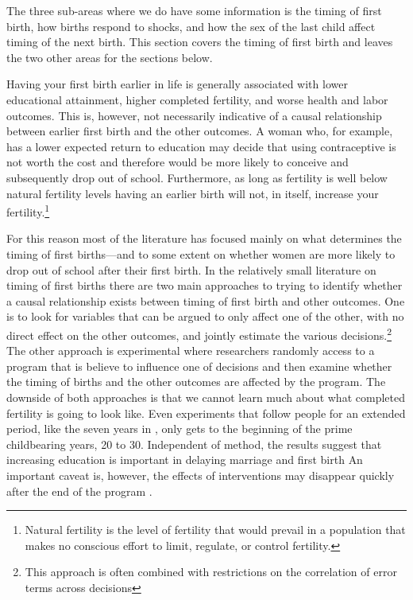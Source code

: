 \documentclass[]{article}
\begin{document}
The three sub-areas where we do have some information is the timing of first birth, how births respond to shocks, and how the sex of the last child affect timing of the next birth. This section covers the timing of first birth and leaves the two other areas for the sections below.

Having your first birth earlier in life is generally associated with lower educational attainment, higher completed fertility, and worse health and labor outcomes. This is, however, not necessarily indicative of a causal relationship between earlier first birth and the other outcomes. A woman who, for example, has a lower expected return to education may decide that using contraceptive is not worth the cost and therefore would be more likely to conceive and subsequently drop out of school. Furthermore, as long as fertility is well below natural fertility levels having an earlier birth will not, in itself, increase your fertility.\footnote{Natural fertility is the level of fertility that would prevail in a population that makes no conscious effort to limit, regulate, or control fertility.}

For this reason most of the literature has focused mainly on what determines the timing of first births---and to some extent on whether women are more likely to drop out of school after their first birth. In the relatively small literature on timing of first births there are two main approaches to trying to identify whether a causal relationship exists between timing of first birth and other outcomes. One is to look for variables that can be argued to only affect one of the other, with no direct effect on the other outcomes, and jointly estimate the various decisions.\footnote{This approach is often combined with restrictions on the correlation of error terms across decisions} The other approach is experimental where researchers randomly access to a program that is believe to influence one of decisions and then examine whether the timing of births and the other outcomes are affected by the program. The downside of both approaches is that we cannot learn much about what completed fertility is going to look like. Even experiments that follow people for an extended period, like the seven years in \citet{Duflo2015}, only gets to the beginning of the prime childbearing years, 20 to 30. Independent of method, the results suggest that increasing education is important in delaying marriage and first birth \citep{Duflo2015,Marchetta2016} An important caveat is, however, the effects of interventions may disappear quickly after the end of the program \citep{Baird2016}.
\end{document}

